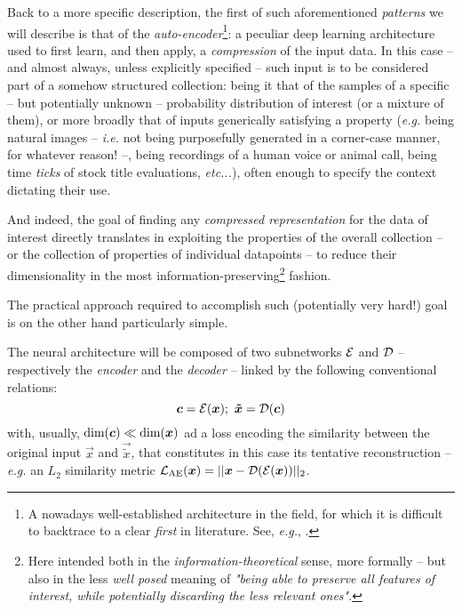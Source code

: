 Back to a more specific description, the first of such aforementioned \textit{patterns} we will describe is that of the \textit{auto-encoder}\footnote{A nowadays well-established architecture in the field, for which it is difficult to backtrace to a clear \textit{first} in literature. See, \textit{e.g.}, \cite{Kramer1991Autoencoders}.}: a peculiar deep learning architecture used to first learn, and then apply, a \textit{compression} of the input data. In this case -- and almost always, unless explicitly specified -- such input is to be considered part of a somehow structured collection: being it that of the samples of a specific -- but potentially unknown -- probability distribution of interest (or a mixture of them), or more broadly that of inputs generically satisfying a property (\textit{e.g.} being natural images -- \textit{i.e.} not being purposefully generated in a corner-case manner, for whatever reason! --, being recordings of a human voice or animal call, being time \textit{ticks} of stock title evaluations, \textit{etc...}), often enough to specify the context dictating their use.

And indeed, the goal of finding any \textit{compressed representation} for the data of interest directly translates in exploiting the properties of the overall collection -- or the collection of properties of individual datapoints -- to reduce their dimensionality in the most information-preserving\footnote{Here intended both in the \textit{information-theoretical} sense, more formally -- but also in the less \textit{well posed} meaning of \textit{"being able to preserve all features of interest, while potentially discarding the less relevant ones"}.} fashion.

The practical approach required to accomplish such (potentially very hard!) goal is on the other hand particularly simple.

The neural architecture will be composed of two subnetworks $\mathcal{E}$ and $\mathcal{D}$ -- respectively the \textit{encoder} and the \textit{decoder} -- linked by the following conventional relations:
$$\bm{c} = \mathcal{E}(\bm{x}); \
\bm{\tilde{x}} = \mathcal{D}(\bm{c})$$
with, usually, $\text{dim}(\bm{c}) \ll \text{dim}(\bm{x})$ ad a loss encoding the similarity between the original input $\vec{x}$ and $\vec{\tilde{x}}$, that constitutes in this case its tentative reconstruction -- \textit{e.g.} an $L_2$ similarity metric \suchthat $\mathcal{L}_{\text{AE}}(\bm{x}) = ||\bm{x} - \mathcal{D}(\mathcal{E}(\bm{x}))||_2$.

